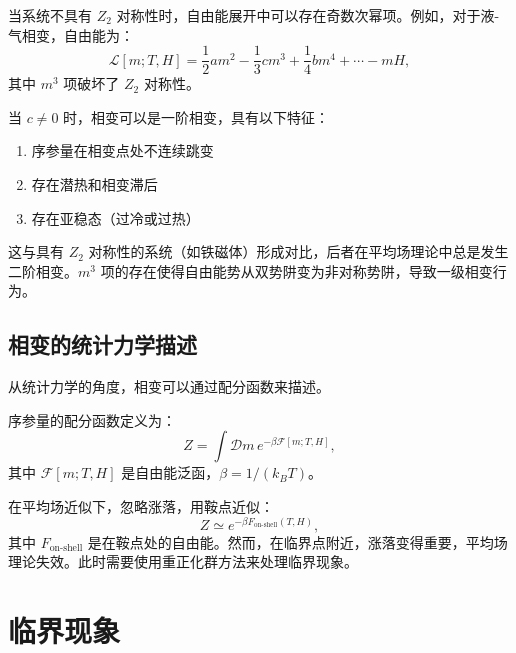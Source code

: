 当系统不具有 $Z_2$ 对称性时，自由能展开中可以存在奇数次幂项。例如，对于液-气相变，自由能为：
\begin{equation}
    \mathcal{L}[m; T, H] = \frac{1}{2} a m^2 - \frac{1}{3} c m^3 + \frac{1}{4} b m^4 + \cdots - m H,
\end{equation}
其中 $m^3$ 项破坏了 $Z_2$ 对称性。

\begin{property}[一阶相变条件]
当 $c \neq 0$ 时，相变可以是一阶相变，具有以下特征：
\begin{enumerate}
    \item 序参量在相变点处不连续跳变
    \item 存在潜热和相变滞后
    \item 存在亚稳态（过冷或过热）
\end{enumerate}
\end{property}

\begin{remark}
这与具有 $Z_2$ 对称性的系统（如铁磁体）形成对比，后者在平均场理论中总是发生二阶相变。$m^3$ 项的存在使得自由能势从双势阱变为非对称势阱，导致一级相变行为。
\end{remark}

\subsection{相变的统计力学描述}

从统计力学的角度，相变可以通过配分函数来描述。

\begin{definition}[序参量的配分函数]
序参量的配分函数定义为：
\begin{equation}
    Z = \int \mathcal{D}m \, e^{-\beta \mathcal{F}[m; T, H]},
\end{equation}
其中 $\mathcal{F}[m; T, H]$ 是自由能泛函，$\beta = 1/(k_B T)$。
\end{definition}

\begin{remark}
在平均场近似下，忽略涨落，用鞍点近似：
\begin{equation}
    Z \simeq e^{-\beta F_{\text{on-shell}}(T, H)},
\end{equation}
其中 $F_{\text{on-shell}}$ 是在鞍点处的自由能。然而，在临界点附近，涨落变得重要，平均场理论失效。此时需要使用重正化群方法来处理临界现象。
\end{remark}

\section{临界现象}

